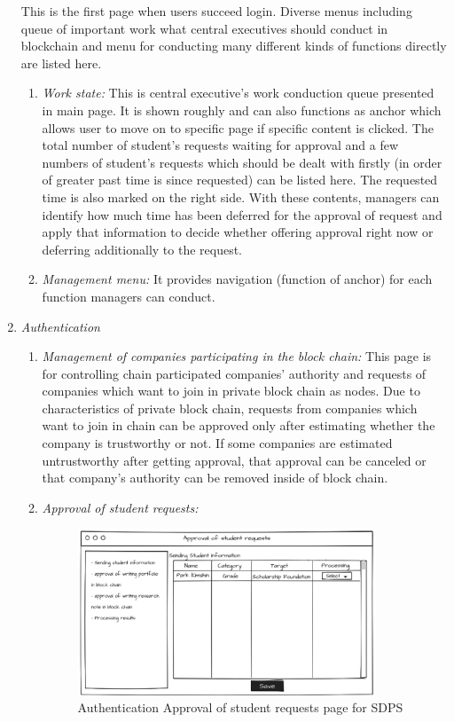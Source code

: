 \documentclass[conference]{IEEEtran}
\begin{document}
\begin{enumerate}
    This is the first page when users succeed login. Diverse menus including queue of important work what central executives should conduct in blockchain and menu for conducting many different kinds of functions directly are listed here.\\
    \begin{enumerate}
    	\item \textit{Work state:} This is central executive’s work conduction queue presented in main page. It is shown roughly and can also functions as anchor which allows user to move on to specific page if specific content is clicked. The total number of student’s requests waiting for approval and a few numbers of student’s requests which should be dealt with firstly (in order of greater past time is since requested) can be listed here. The requested time is also marked on the right side. With these contents, managers can identify how much time has been deferred for the approval of request and apply that information to decide whether offering approval right now or deferring additionally to the request.\\
        \item \textit{Management menu:} It provides navigation (function of anchor) for each function managers can conduct.\\
    \end{enumerate}
    
    \item \textit {Authentication}
    \begin{enumerate}
    	\item \textit{Management of companies participating in the block chain:} This page is for controlling chain participated companies’ authority and requests of companies which want to join in private block chain as nodes. Due to characteristics of private block chain, requests from companies which want to join in chain can be approved only after estimating whether the company is trustworthy or not. If some companies are estimated untrustworthy after getting approval, that approval can be canceled or that company’s authority can be removed inside of block chain.\\
        \item \textit{Approval of student requests:}
        \begin{figure}[htbp]
	\centerline{\includegraphics[width=89mm,scale=0.5]{school/approval_of_student_request.png}}
	\caption{Authentication Approval of student requests page for SDPS}
	\label{fig}
	\end{figure} 
        

\end{enumerate}
\end{enumerate}
\end{document}
